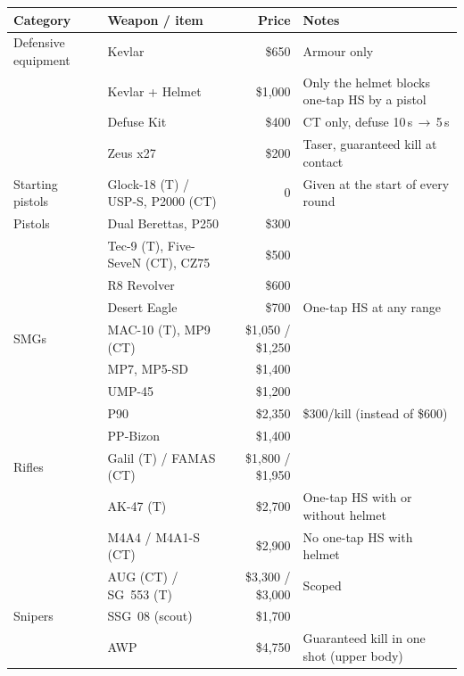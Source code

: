 \begin{table}[!htbp]
\centering
\footnotesize
\begin{tabular}{@{}ll r l@{}}
\toprule
\textbf{Category} & \textbf{Weapon / item} & \textbf{Price} & \textbf{Notes} \\
\midrule
Defensive equipment & Kevlar               & \$650  & Armour only \\
                    & Kevlar + Helmet      & \$1{,}000 & Only the helmet blocks one-tap HS by a pistol \\
                    & Defuse Kit           & \$400  & CT only, defuse 10\,s\,$\to$\,5\,s \\
                    & Zeus x27             & \$200  & Taser, guaranteed kill at contact \\
\midrule
Starting pistols    & Glock-18 (T) / USP-S, P2000 (CT) & 0 & Given at the start of every round \\
Pistols             & Dual Berettas, P250  & \$300  & \\
                    & Tec-9 (T), Five-SeveN (CT), CZ75 & \$500 & \\
                    & R8 Revolver          & \$600  & \\
                    & Desert Eagle         & \$700  & One-tap HS at any range \\
\midrule
SMGs                & MAC-10 (T), MP9 (CT) & \$1{,}050 / \$1{,}250 & \\
                    & MP7, MP5-SD          & \$1{,}400 & \\
                    & UMP-45               & \$1{,}200 & \\
                    & P90                  & \$2{,}350 & \$300/kill (instead of \$600) \\
                    & PP-Bizon             & \$1{,}400 & \\
\midrule
Rifles              & Galil (T) / FAMAS (CT) & \$1{,}800 / \$1{,}950 & \\
                    & AK-47 (T)            & \$2{,}700 & One-tap HS with or without helmet \\
                    & M4A4 / M4A1-S (CT)   & \$2{,}900 & No one-tap HS with helmet \\
                    & AUG (CT) / SG~553 (T) & \$3{,}300 / \$3{,}000 & Scoped \\
\midrule
Snipers             & SSG~08 (scout)       & \$1{,}700 & \\
                    & AWP                  & \$4{,}750 & Guaranteed kill in one shot (upper body) \\

\end{tabular}
\end{table}
